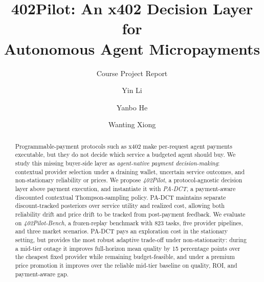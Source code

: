 \documentclass[sigconf, nonacm]{acmart}
\DeclareRobustCommand{\padct}{PA\nobreakdash-DCT}
\begin{document}
\title[402Pilot Course Report]{\texorpdfstring{402Pilot: An x402 Decision Layer for\\Autonomous Agent Micropayments}{402Pilot: An x402 Decision Layer for Autonomous Agent Micropayments}}
\subtitle{Course Project Report}

\author{Yin Li}

\author{Yanbo He}

\author{Wanting Xiong}
\renewcommand{\shortauthors}{Li, He, and Xiong}

\begin{abstract}
Programmable-payment protocols such as x402 make per-request agent payments executable, but they do not decide which service a budgeted agent should buy. We study this missing buyer-side layer as \emph{agent-native payment decision-making}: contextual provider selection under a draining wallet, uncertain service outcomes, and non-stationary reliability or prices. We propose \emph{402Pilot}, a protocol-agnostic decision layer above payment execution, and instantiate it with \emph{\padct}, a payment-aware discounted contextual Thompson-sampling policy. \padct{} maintains separate discount-tracked posteriors over service utility and realized cost, allowing both reliability drift and price drift to be tracked from post-payment feedback. We evaluate on \emph{402Pilot-Bench}, a frozen-replay benchmark with 823 tasks, five provider pipelines, and three market scenarios. \padct{} pays an exploration cost in the stationary setting, but provides the most robust adaptive trade-off under non-stationarity: during a mid-tier outage it improves full-horizon mean quality by 15 percentage points over the cheapest fixed provider while remaining budget-feasible, and under a premium price promotion it improves over the reliable mid-tier baseline on quality, ROI, and payment-aware gap.
\end{abstract}


\maketitle
\end{document}
